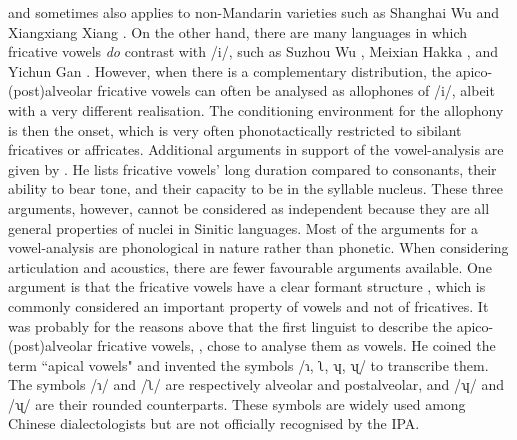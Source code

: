\documentclass[output=paper,colorlinks,citecolor=brown,chinesefont]{langscibook}
\begin{document}
and sometimes also applies to non-Mandarin varieties such as Shanghai Wu \citep{Chen&Gussenhoven_2015} and Xiangxiang Xiang \citep{Zeng_2020}. On the other hand, there are many languages in which fricative vowels \textit{do} contrast with /i/, such as Suzhou Wu \citep{Hu&Ling_2019}, Meixian Hakka \citep{Lee&Zee_2009}, and Yichun Gan \citep{Li_2018}. However, when there is a complementary distribution, the apico-(post)alveolar fricative vowels can often be analysed as allophones of /i/, albeit with a very different realisation. The conditioning environment for the allophony is then the onset, which is very often phonotactically restricted to sibilant fricatives or affricates. Additional arguments in support of the vowel-analysis are given by \citet{baron_1974}. He lists fricative vowels' long duration compared to consonants, their ability to bear tone, and their capacity to be in the syllable nucleus. These three arguments, however, cannot be considered as independent because they are all general properties of nuclei in Sinitic languages. Most of the arguments for a vowel-analysis are phonological in nature rather than phonetic. When considering articulation and acoustics, there are fewer favourable arguments available. One argument is that the fricative vowels have a clear formant structure \citep[10]{Howie_1976}, which is commonly considered an important property of vowels and not of fricatives. It was probably for the reasons above that the first linguist to describe the apico-(post)alveolar fricative vowels, \citet{Karlgren_1915}, chose to analyse them as vowels. He coined the term ``apical vowels" and invented the symbols /ɿ, ʅ, ʮ, ʯ/ to transcribe them. The symbols /ɿ/ and /ʅ/ are respectively alveolar and postalveolar, and /ʮ/ and /ʯ/ are their rounded counterparts. These symbols are widely used among Chinese dialectologists but are not officially recognised by the IPA.
\end{document}
